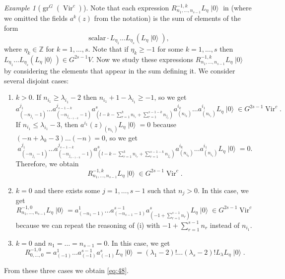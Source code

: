 \documentclass[a4paper, 12pt, reqno]{amsart}
\theoremstyle{remark}
\newtheorem{example}[theorem]{Example}
\numberwithin{equation}{subsection}
\DeclareMathOperator{\Vir}{Vir}
\DeclareMathOperator{\gr}{gr}
\DeclareMathOperator{\vac}{|0\rangle}
\begin{document}
\begin{example}[$\gr^G(\Vir^c)$]
  Note that each expression $R^{-1, k}_{n_1, \dots, n_{s - 1}}L_{\eta}\vac$ in  (where we omitted the fields $a^k(z)$ from the notation) is the sum of elements of the form
  \begin{equation*}
    \text{scalar}\cdot L_{\eta_1}\dots L_{\eta_s}(L_{\eta}\vac),
  \end{equation*}
  where $\eta_k \in \mathbb{Z}$ for $k = 1, \dots, s$.
  Note that if $\eta_k \ge -1$ for some $k = 1, \dots, s$ then $L_{\eta_1}\dots L_{\eta_s}(L_{\eta}\vac) \in G^{2s - 1}V$.
  Now we study these expressions $R^{-1, k}_{n_1, \dots, n_{s - 1}}L_{\eta}\vac$ by considering the elements that appear in the sum defining it.
  We consider several disjoint cases:
  \begin{enumerate}
  \item $k > 0$. If $n_{i_1} \ge \lambda_{i_1} - 2$ then $n_{i_1} + 1 - \lambda_{i_1} \ge -1$, so we get
    \begin{equation*}
      a^{j_1}_{(-n_{j_1} - 1)}\dots a^{j_{s - 1 - k}}_{(-n_{j_{s - 1 - k}} - 1)}a^s_{(l - k - \sum_{r = 1}^kn_{i_r} + \sum_{r = 1}^{s - 1 - k}n_{j_r})}a^{i_k}_{(n_{i_k})}\dots a^{i_1}_{(n_{i_1})}L_{\eta}\vac \in G^{2s - 1}\Vir^c.
    \end{equation*}
    If $n_{i_1} \le \lambda_{i_1} - 3$, then $a^{i_1}(z)_{(n_{i_1})}L_{\eta}\vac = 0$ because $(-n + \lambda_k - 3)\dots(-n) = 0$, so we get
    \begin{equation*}
      a^{j_1}_{(-n_{j_1} - 1)}\dots a^{j_{s - 1 - k}}_{(-n_{j_{s - 1 - k}} - 1)}a^s_{(l - k - \sum_{r = 1}^kn_{i_r} + \sum_{r = 1}^{s - 1 - k}n_{j_r})}a^{i_k}_{(n_{i_k})}\dots a^{i_1}_{(n_{i_1})}L_{\eta}\vac = 0.
    \end{equation*}
    Therefore, we obtain
    \begin{equation*}
      R^{-1, k}_{n_1, \dots, n_{s - 1}}L_{\eta}\vac \in G^{2s - 1}\Vir^c.
    \end{equation*}
  \item $k = 0$ and there exists some $j = 1, \dots, s - 1$ such that $n_j > 0$.
    In this case, we get
    \begin{equation*}
      R^{-1, 0}_{n_1, \dots, n_{s - 1}}L_{\eta}\vac = a^1_{(-n_1 - 1)}\dots a^{s - 1}_{(-n_{s - 1} - 1)}a^s_{(-1 + \sum_{r = 1}^{s - 1}n_r)}L_{\eta}\vac \in G^{2s - 1}\Vir^c
    \end{equation*}
    because we can repeat the reasoning of (i) with $-1 + \sum_{r = 1}^{s - 1}n_r$ instead of $n_{i_1}$.
  \item $k = 0$ and $n_1 = \dots = n_{s - 1} = 0$. In this case, we get
    \begin{equation*}
      R^{-1, 0}_{0, \dots, 0} = a^1_{(-1)}\dots a^{s - 1}_{(-1)}a^s_{(-1)} L_{\eta}\vac = (\lambda_1 - 2)!\dots(\lambda_s - 2)!L_{\lambda} L_{\eta}\vac.
    \end{equation*}
  \end{enumerate}
  From these three cases we obtain \eqref{eq:48}.


\end{example}
\end{document}
